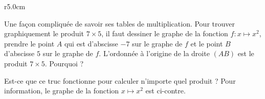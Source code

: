 
\begin{exercice}\label{exosmath-0545}

\begin{wrapfigure}{r}{5.0cm}
   \vspace{-0.5cm}        %
   \centering
   
\end{wrapfigure}

    Une façon compliquée de savoir ses tables de multiplication. Pour trouver graphiquement le produit \( 7\times 5\), il faut dessiner le graphe de la fonction \( f\colon x\mapsto x^2\), prendre le point \( A\) qui est d'abscisse \( -7\) sur le graphe de \( f\) et le point \( B\) d'abscisse \( 5\) sur le graphe de \( f\). L'ordonnée à l'origine de la droite \( (AB)\) est le produit \( 7\times 5\). Pourquoi ?

    Est-ce que ce truc fonctionne pour calculer n'importe quel produit ? Pour information, le graphe de la fonction \( x\mapsto x^2\) est ci-contre.

\end{exercice}
